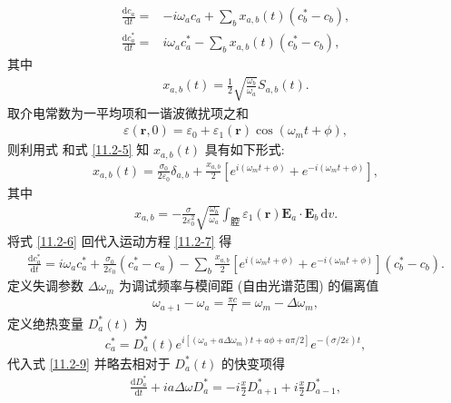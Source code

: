\documentclass{note}
\begin{document}
\begin{sol}
    \begin{align}
        \label{11.2-7}
        \frac{\mathrm{d}c_a}{\mathrm{d}t}=&-i\omega_ac_a+\sum_bx_{a,b}(t)(c_b^*-c_b),\\
        \label{11.2-8}
        \frac{\mathrm{d}c_a^*}{\mathrm{d}t}=&i\omega_ac_a^*-\sum_bx_{a,b}(t)(c_b^*-c_b),
    \end{align}
    其中
    \begin{align}
        \label{11.2-5}
        x_{a,b}(t)=\frac{1}{2}\sqrt{\frac{\omega_b}{\omega_a}}S_{a,b}(t).
    \end{align}
    取介电常数为一平均项和一谐波微扰项之和
    \begin{align}
        \varepsilon(\bm{r},0)=\varepsilon_0+\varepsilon_1(\bm{r})\cos(\omega_mt+\phi),
    \end{align}
    则利用式  和式 \eqref{11.2-5} 知 $x_{a,b}(t)$ 具有如下形式:
    \begin{align}
        \label{11.2-6}
        x_{a,b}(t)=\frac{\sigma_0}{2\varepsilon_0}\delta_{a,b}+\frac{x_{a,b}}{2}[e^{i(\omega_mt+\phi)}+e^{-i(\omega_mt+\phi)}],
    \end{align}
    其中
    \begin{align}
        x_{a,b}=-\frac{\sigma}{2\varepsilon_0^2}\sqrt{\frac{\omega_b}{\omega_a}}\int_{\text{腔}}\varepsilon_1(\bm{r})\bm{E}_a\cdot\bm{E}_b\,\mathrm{d}v.
    \end{align}
    将式 \eqref{11.2-6} 回代入运动方程 \eqref{11.2-7} 得
    \begin{align}
        \label{11.2-9}
        \frac{\mathrm{d}c_a^*}{\mathrm{d}t}=i\omega_ac_a^*+\frac{\sigma_0}{2\varepsilon_0}(c_a^*-c_a)-\sum_b\frac{x_{a,b}}{2}[e^{i(\omega_mt+\phi)}+e^{-i(\omega_mt+\phi)}](c_b^*-c_b).
    \end{align}
    定义失调参数 $\Delta\omega_m$ 为调试频率与模间距 (自由光谱范围) 的偏离值
    \begin{align}
        \omega_{a+1}-\omega_a=\frac{\pi c}{l}=\omega_m-\Delta\omega_m,
    \end{align}
    定义绝热变量 $D_a^*(t)$ 为
    \begin{align}
        c_a^*=D_a^*(t)e^{i[(\omega_a+a\Delta\omega_m)t+a\phi+a\pi/2]}e^{-(\sigma/2\varepsilon)t},
    \end{align}
    代入式 \eqref{11.2-9} 并略去相对于 $D_a^*(t)$ 的快变项得
    \begin{align}
        \frac{\mathrm{d}D_a^*}{\mathrm{d}t}+ia\Delta\omega D_a^*=-i\frac{x}{2}D_{a+1}^*+i\frac{x}{2}D_{a-1}^*,
    \end{align}

\end{sol}
\end{document}
